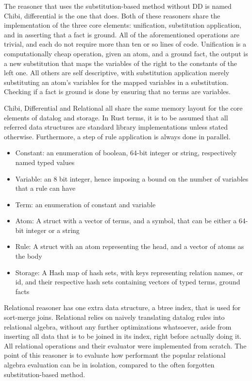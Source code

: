 \documentclass[sigconf,screen,review=false,natbib]{acmart}
\theoremstyle{definition}
\begin{document}
The reasoner that uses the substitution-based method without DD is named Chibi, differential is the one that does. Both of these
reasoners share the implementation of the three core elements: unification, substitution application, and in asserting that a
fact is ground. All of the aforementioned operations are trivial, and each do not require more than ten or so lines of code. Unification
is a computationally cheap operation, given an atom, and a ground fact, the output is a new substitution that maps the variables
of the right to the constants of the left one. All others are self descriptive, with substitution application merely substituting
an atom's variables for the mapped variables in a substitution. Checking if a fact is ground is done by ensuring that no terms
are variables.

Chibi, Differential and Relational all share the same memory layout for the core elements of datalog and storage. In Rust terms, it
is to be assumed that all referred data structures are standard library implementations unless stated otherwise. Furthermore, a step
of rule application is always done in parallel.
\begin{itemize}
	\item Constant: an enumeration of boolean, 64-bit integer or string, respectively named typed values
	\item Variable: an 8 bit integer, hence imposing a bound on the number of variables that a rule can have
	\item Term: an enumeration of constant and variable
	\item Atom: A struct with a vector of terms, and a symbol, that can be either a 64-bit integer or a string
	\item Rule: A struct with an atom representing the head, and a vector of atoms as the body
	\item Storage: A Hash map of hash sets, with keys representing relation names, or id, and their respective
	      hash sets containing vectors of typed terms, ground facts
\end{itemize}
Relational reasoner has one extra data structure, a btree index, that is used for sort-merge joins. Relational relies on
naively translating datalog rules into relational algebra, without any further optimizations whatsoever, aside from inserting
all data that is to be joined in its index, right before actually doing it. All relational operations and their evaluator
were implemented from scratch. The point of this reasoner is to evaluate how performant the popular relational algebra
evaluation can be in isolation, compared to the often forgotten substitution-based method.
\end{document}
